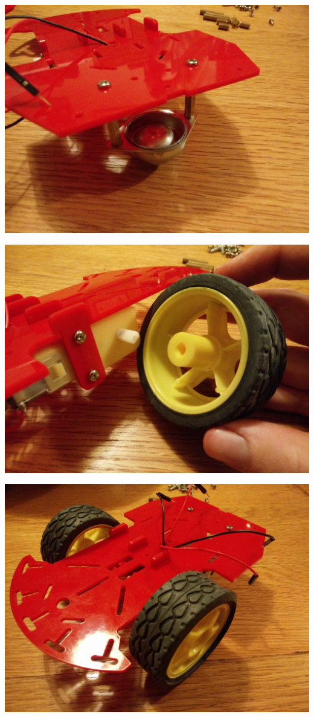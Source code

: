 \documentclass[]{bilingualworkshop}
\begin{document}
    \includegraphics[width=15cm]{img/10.jpg}\par
    \includegraphics[width=15cm]{img/11.jpg}\par
    \includegraphics[width=15cm]{img/12.jpg}
\end{document}
